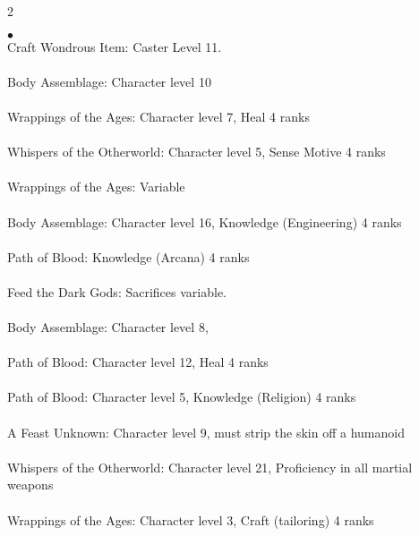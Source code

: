 \begin{multicols}{2}
\begin{small}
\begin{list}{$\bullet$}{\itemspace}
\\
Craft Wondrous Item: Caster Level 11.\\
\\
Body Assemblage: Character level 10\\
\\
Wrappings of the Ages: Character level 7, Heal 4 ranks\\
\\
Whispers of the Otherworld: Character level 5, Sense Motive 4 ranks\\
\\
Wrappings of the Ages: Variable\\
\\
Body Assemblage: Character level 16, Knowledge (Engineering) 4 ranks\\
\\
Path of Blood: Knowledge (Arcana) 4 ranks\\
\\
Feed the Dark Gods: Sacrifices variable.\\
\\
Body Assemblage: Character level 8, \\
\\
Path of Blood: Character level 12, Heal 4 ranks\\
\\
Path of Blood: Character level 5, Knowledge (Religion) 4 ranks\\
\\
A Feast Unknown: Character level 9, must strip the skin off a humanoid\\
\\
Whispers of the Otherworld: Character level 21, Proficiency in all martial weapons\\
\\
Wrappings of the Ages: Character level 3, Craft (tailoring) 4 ranks\\

\end{list}
\end{small}
\end{multicols}
